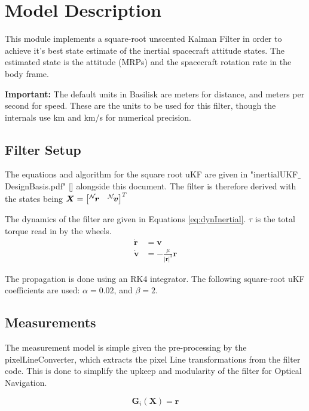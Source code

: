 
\section{Model Description}

This module implements a square-root unscented Kalman Filter in order to achieve it's best state estimate of the inertial spacecraft attitude states. The estimated state is the attitude (MRPs) and the spacecraft rotation rate in the body frame. 

\textbf{Important:} The default units in Basilisk are meters for distance, and meters per second for speed. These are the units to be used for this filter, though the internals use km and km/s for numerical precision. 

\subsection{Filter Setup} %

The equations and algorithm for the square root uKF are given in "inertialUKF$\_$DesignBasis.pdf" [] alongside this document.
The filter is therefore derived with the states being $\bm X =\begin{bmatrix} \leftexp{N}{\bm r}&  \leftexp{N}{\bm v} \end{bmatrix}^{T}$

The dynamics of the filter are given in Equations \eqref{eq:dynInertial}. $\tau$ is the total torque read in by the wheels. 
\begin{align}
\label{eq:dynInertial}
\dot{\bm r} &=\bm v \\
\dot{\bm v} & = - \frac{\mu}{|\bm r|^3} \bm r
\end{align}

The propagation is done using an RK4 integrator. 
The following square-root uKF coefficients are used: $\alpha = 0.02$, and $\beta = 2$. 


\subsection{Measurements}

The measurement model is simple given the pre-processing by the pixelLineConverter, which extracts the pixel Line transformations from the filter code. This is done to simplify the upkeep and modularity of the filter for Optical Navigation. 

\begin{equation}\label{eq:meas}
\bm G_i(\bm X) = \bm r
\end{equation}
